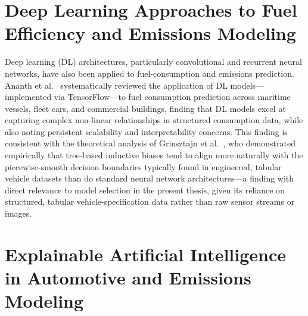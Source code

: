 \section{Deep Learning Approaches to Fuel Efficiency and Emissions Modeling}

\sloppy 
Deep learning (DL) architectures, particularly convolutional and recurrent neural networks, have also been applied to fuel-consumption and emissions prediction. Ananth et al.~\cite{zhu2024research} systematically reviewed the application of DL models---implemented via TensorFlow---to fuel consumption prediction across maritime vessels, fleet cars, and commercial buildings, finding that DL models excel at capturing complex non-linear relationships in structured consumption data, while also noting persistent scalability and interpretability concerns. This finding is consistent with the theoretical analysis of Grinsztajn et al.~\cite{grinsztajn2022tree}, who demonstrated empirically that tree-based inductive biases tend to align more naturally with the piecewise-smooth decision boundaries typically found in engineered, tabular vehicle datasets than do standard neural network architectures---a finding with direct relevance to model selection in the present thesis, given its reliance on structured, tabular vehicle-specification data rather than raw sensor streams or images.


\section{Explainable Artificial Intelligence in Automotive and Emissions Modeling}

